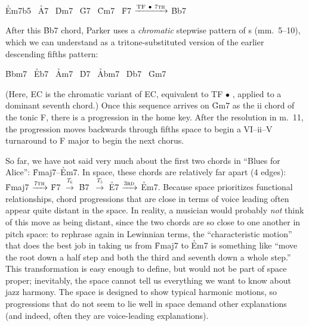 \begin{center}
  \h{Em7b5} \TFarrow\ \h{A7} \ECarrow\
  \h{Dm7}   \TFarrow\ \h{G7} \ECarrow\
  \h{Cm7}   \TFarrow\ \h{F7} $\xrightarrow{\mathrm{TF}\ \bullet\ \text{\textsc{7th}}}$
  \h{Bb7}
\end{center}

After this \h{Bb7} chord, Parker uses a \emph{chromatic} stepwise pattern of \tf{}s
(mm.~5--10), which we can understand as a tritone-substituted version of the
earlier descending fifths pattern:

\begin{center}
  \h{Bbm7} \TFarrow\ \h{Eb7} \ECCarrow\
  \h{Am7}  \TFarrow\ \h{D7}  \ECCarrow\
  \h{Abm7} \TFarrow\ \h{Db7} \ECCarrow\
  \h{Gm7}
\end{center}

\noindent (Here, EC\tsub{C} is the chromatic variant of EC, equivalent to TF
$\bullet$ \slideS, applied to a dominant seventh chord.) Once this sequence
arrives on \h{Gm7} as the ii chord of the tonic F, there is a \tfo progression
in the home key. After the resolution in m.~11, the progression moves
backwards through fifths space to begin a VI--ii--V turnaround to F major to
begin the next chorus.\fn{tft-8}

So far, we have not said very much about the first two chords in ``Blues for
Alice'': \h{Fmaj7}--\h{Em7}. In \tf space, these chords are relatively far
apart (4 edges): \h{Fmaj7} $\xrightarrow{\text{\textsc{7th}}}$ \h{F7} $\xrightarrow{T_6}$
\mbox{\h{B7} $\xrightarrow{T_5}$} \h{E7} $\xrightarrow{\text{\textsc{3rd}}}$ \h{Em7}.
Because \tf space prioritizes functional relationships, chord progressions
that are close in terms of voice leading often appear quite distant in the
space. In reality, a musician would probably \emph{not} think of this move as
being distant, since the two chords are so close to one another
in pitch space: to rephrase again in Lewinnian terms, the ``characteristic
motion'' that does the best job in taking us from \h{Fmaj7} to \h{Em7} is
something like ``move the root down a half step and both the third and seventh
down a whole step.'' This transformation is easy enough to define, but would
not be part of \tf space proper; inevitably, the space cannot tell us
everything we want to know about jazz harmony. The space is designed to show
typical harmonic motions, so progressions that do not seem to lie well in \tf
space demand other explanations (and indeed, often they are voice-leading
explanations).



